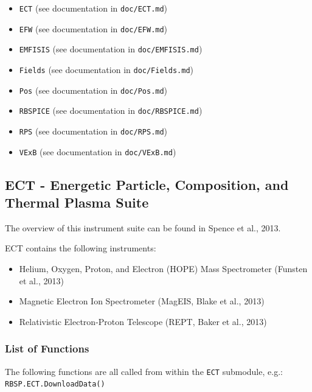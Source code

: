 	\begin{itemize}
		\item \texttt{ECT} (see documentation in \texttt{doc/ECT.md})
		\item \texttt{EFW} (see documentation in \texttt{doc/EFW.md})
		\item \texttt{EMFISIS} (see documentation in \texttt{doc/EMFISIS.md})
		\item \texttt{Fields} (see documentation in \texttt{doc/Fields.md})
		\item \texttt{Pos} (see documentation in \texttt{doc/Pos.md})
		\item \texttt{RBSPICE} (see documentation in \texttt{doc/RBSPICE.md})
		\item \texttt{RPS} (see documentation in \texttt{doc/RPS.md})
		\item \texttt{VExB} (see documentation in \texttt{doc/VExB.md})
	\end{itemize}
	
	\subsection{ECT - Energetic Particle, Composition, and Thermal Plasma Suite}
	
	The overview of this instrument suite can be found in Spence et al., 2013.
	
	ECT contains the following instruments:
	
	\begin{itemize}
		\item Helium, Oxygen, Proton, and Electron (HOPE) Mass Spectrometer (Funsten et al., 2013)
		\item Magnetic Electron Ion Spectrometer (MagEIS, Blake et al., 2013)
		\item Relativistic Electron-Proton Telescope (REPT, Baker et al., 2013)
	\end{itemize}
	
	\subsubsection{List of Functions}
	
	The following functions are all called from within the \texttt{ECT} submodule, e.g.: \texttt{RBSP.ECT.DownloadData()}
	

